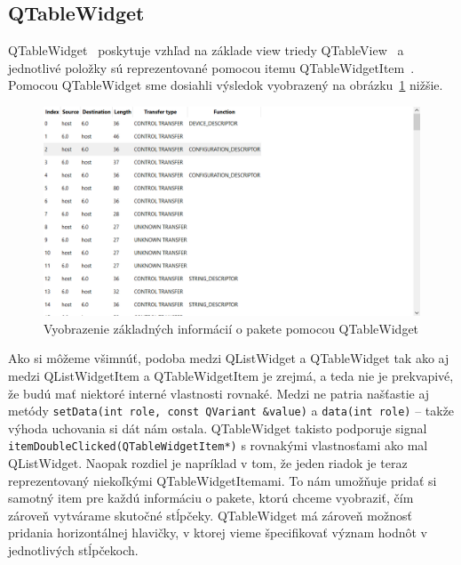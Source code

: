 \subsection*{QTableWidget}
\label{kap03:sec:table_widget}
QTableWidget~\cite{qtablewidget} poskytuje vzhľad na základe view triedy QTableView~\cite{qtableview} a jednotlivé položky sú reprezentované pomocou itemu QTableWidgetItem~\cite{qtablewidgetitem}. Pomocou QTableWidget sme dosiahli výsledok vyobrazený na obrázku~\ref{obr:kap3:TableViewLook} nižšie.

\begin{figure}[!htb]
	\centering
	\includegraphics[width=\textwidth]{img/kap03_TableViewLook}
	\caption{Vyobrazenie základných informácií o pakete pomocou QTableWidget}
	\label{obr:kap3:TableViewLook}
\end{figure}

Ako si môžeme všimnúť, podoba medzi QListWidget a QTableWidget tak ako aj medzi QListWidgetItem a QTableWidgetItem je zrejmá, a teda nie je prekvapivé, že budú mať niektoré interné vlastnosti rovnaké. Medzi ne patria našťastie aj metódy \texttt{setData(int role, const QVariant \&value)} a \texttt{data(int role)} -- takže výhoda uchovania si dát nám ostala. QTableWidget takisto podporuje signal  \texttt{itemDoubleClicked(QTableWidgetItem*)} s rovnakými vlastnosťami ako mal QListWidget. Naopak rozdiel je napríklad v tom, že jeden riadok je teraz reprezentovaný niekoľkými QTableWidgetItemami. To nám umožňuje pridať si samotný item pre každú informáciu o pakete, ktorú chceme vyobraziť, čím zároveň vytvárame skutočné stĺpčeky. QTableWidget má zároveň možnosť pridania horizontálnej hlavičky, v ktorej vieme špecifikovať význam hodnôt v jednotlivých stĺpčekoch.

